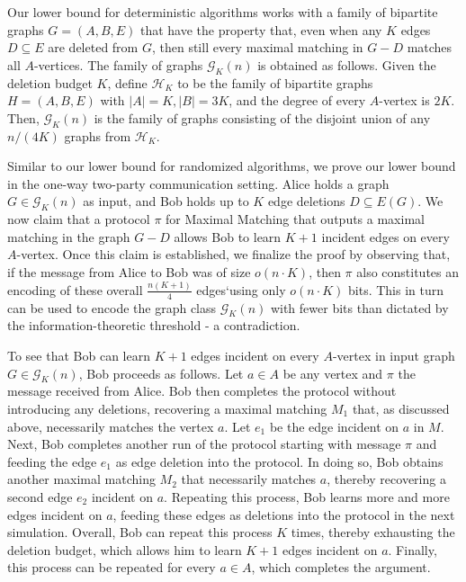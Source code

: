 \documentclass[11pt,a4paper]{article}
\begin{document}
Our lower bound for deterministic algorithms works with a family of bipartite graphs $G=(A, B, E)$ that have the property that, even when any $K$ edges $D \subseteq E$ are deleted from $G$, then still every maximal matching in $G - D$ matches all $A$-vertices. %
The family of graphs $\mathcal{G}_K(n)$ is obtained as follows. Given the deletion budget $K$, define $\mathcal{H}_K$ to be the family of bipartite graphs $H=(A, B, E)$ with $|A| = K, |B| = 3K$, and the degree of every $A$-vertex is $2K$. Then, $\mathcal{G}_K(n)$ is the family of graphs consisting of the disjoint union of any $n/(4K)$ graphs from $\mathcal{H}_K$. 

Similar to our lower bound for randomized algorithms, we prove our lower bound in the one-way two-party communication setting. Alice holds a graph $G \in \mathcal{G}_K(n)$ as input, and Bob holds up to $K$ edge deletions $D \subseteq E(G)$. We now claim that a protocol $\pi$ for \textsf{Maximal Matching} that outputs a maximal matching in the graph $G - D$ allows Bob to learn $K+1$ incident edges on every $A$-vertex. Once this claim is established, we finalize the proof by observing that, if the message from Alice to Bob was of size $o(n \cdot K)$, then $\pi$ also constitutes an encoding of these overall $\frac{n(K+1)}{4}$ edges`using only $o(n \cdot K)$ bits. This in turn can be used to encode the graph class $\mathcal{G}_K(n)$ with fewer bits than dictated by the information-theoretic threshold - a contradiction.

To see that Bob can learn $K+1$ edges incident on every $A$-vertex in input graph $G \in \mathcal{G}_K(n)$, Bob proceeds as follows. Let $a \in A$ be any vertex and $\pi$ the message received from Alice. Bob then completes the protocol without introducing any deletions, recovering a maximal matching $M_1$ that, as discussed above, necessarily matches the vertex $a$. Let $e_1$ be the edge incident on $a$ in $M$. Next, Bob completes another run of the protocol starting with message $\pi$ and feeding the edge $e_1$ as edge deletion into the protocol. In doing so, Bob obtains another maximal matching $M_2$ that necessarily matches $a$, thereby recovering a second edge $e_2$ incident on $a$. Repeating this process, Bob learns more and more edges incident on $a$, feeding these edges as deletions into the protocol in the next simulation. Overall, Bob can repeat this process $K$ times, thereby exhausting the deletion budget, which allows him to learn $K+1$ edges incident on $a$. Finally, this process can be repeated for every $a \in A$, which completes the argument.
\end{document}
